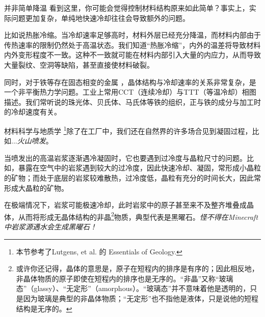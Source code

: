 \begin{example}{并非简单降温}
看到这里，你可能会觉得控制材料结构原来如此简单？事实上，实际问题更加复杂，单纯地快速冷却往往会导致额外的问题。

比如说热胀冷缩。当冷却速率足够高时，材料外层已经充分降温，而材料内部由于传热速率的限制仍然处于高温状态。我们知道“热胀冷缩”，内外的温差将导致材料内外变形程度不一致。这种不一致就可能在材料内部引入大量的内应力，从而导致大量裂纹、空洞等缺陷，甚至直接使材料破裂。

同时，对于铁等存在固态相变的金属  ，晶体结构与冷却速率的关系非常复杂，是一个非平衡热力学问题。工业上常用CCT（连续冷却）与TTT（等温冷却）相图描述。我们常听说的珠光体、贝氏体、马氏体等铁的组织，正与铁的成分与加工时的冷却速度有关。
\end{example}

\begin{example}{材料科学与地质学}
\footnote{本节参考了Lutgens, et al. 的 Essentials of Geology.}除了在工厂中，我们还在自然界的许多场合见到凝固过程，比如...\textsl{火山喷发}。

当喷发出的高温岩浆逐渐遇冷凝固时，它也要遇到过冷度与晶粒尺寸的问题。比如，暴露在空气中的岩浆遇到较大的过冷度，因此快速冷却、凝固，常形成小晶粒的矿物；而处于底层的岩浆较难散热，过冷度低，晶粒有充分的时间长大，因此常形成大晶粒的矿物。

在极端情况下，岩浆可能极速冷却，此时岩浆中的原子甚至来不及整齐堆叠成晶体，从而将形成无晶体结构的非晶\footnote{或许你还记得，晶体的意思是，原子在短程内的排序是有序的；因此相反地，非晶体物质的原子即使在短程内的排序也是无序的。“非晶”又称“玻璃态”（glassy）、“无定形”（amorphous）。“玻璃态”并不意味着他是透明的，只是因为玻璃是典型的非晶体物质；“无定形”也不指他是液体，只是说他的短程结构是无序的。}物质，典型代表是黑曜石。\textsl{怪不得在Minecraft中岩浆源遇水会生成黑曜石！}
\end{example}
